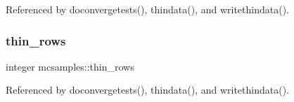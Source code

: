 Referenced by doconvergetests(), thindata(), and writethindata().

\mbox{\label{namespacemcsamples_a868898642c4ad498fccad75315810550}} 
\subsubsection{\texorpdfstring{thin\+\_\+rows}{thin\_rows}}
{\footnotesize\ttfamily integer mcsamples\+::thin\+\_\+rows}



Referenced by doconvergetests(), thindata(), and writethindata().

